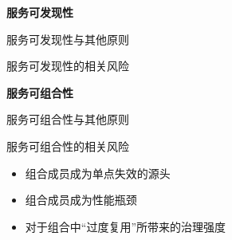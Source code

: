 \textbf{服务可发现性} \par
服务可发现性与其他原则
\begin{spacing}{1.2}
    \vspace{-0.5em}
    
    \vspace{-1em}
\end{spacing}

服务可发现性的相关风险
\begin{spacing}{1.2}
    \vspace{-0.5em}
    
    \vspace{-1em}
\end{spacing}

\textbf{服务可组合性} \par
服务可组合性与其他原则
\begin{spacing}{1.2}
    \vspace{-0.5em}
    
    \vspace{-1em}
\end{spacing}

服务可组合性的相关风险
\vspace{-0.8em}
\begin{multicols}{2}
    \begin{itemize}
        \item 组合成员成为单点失效的源头
        \item 组合成员成为性能瓶颈
        \item 对于组合中“过度复用”所带来的治理强度
    \end{itemize}
\end{multicols}
\vspace{-1em}




